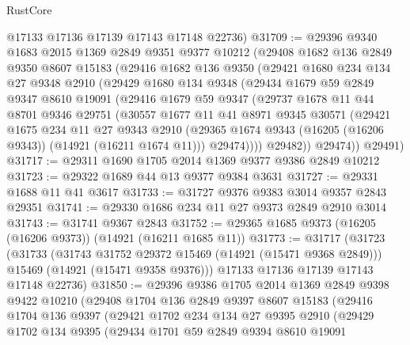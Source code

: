 \begin{lexlean}{RustCore}
\begin{coremodule}
      @17133
      @17136
      @17139
      @17143
      @17148
      @22736)
@31709 := @29396
    @9340
    @1683
    @2015
    @1369
    @2849
    @9351
    @9377
    @10212
    (@29408
      @1682
      @136
      @2849
      @9350
      @8607
      @15183
      (@29416
        @1682
        @136
        @9350
        (@29421
          @1680
          @234
          @134
          @27
          @9348
          @2910
          (@29429
            @1680
            @134
            @9348
            (@29434
              @1679
              @59
              @2849
              @9347
              @8610
              @19091
              (@29416
                @1679
                @59
                @9347
                (@29737
                  @1678
                  @11
                  @44
                  @8701
                  @9346
                  @29751
                  (@30557
                    @1677
                    @11
                    @41
                    @8971
                    @9345
                    @30571
                    (@29421
                      @1675
                      @234
                      @11
                      @27
                      @9343
                      @2910
                      (@29365 @1674 @9343 (@16205 (@16206 @9343)) (@14921 (@16211 @1674 @11)))
                      @29474))))
              @29482))
          @29474))
      @29491)
@31717 := @29311 @1690 @1705 @2014 @1369 @9377 @9386 @2849 @10212
@31723 := @29322 @1689 @44 @13 @9377 @9384 @3631
@31727 := @29331 @1688 @11 @41 @3617
@31733 := @31727 @9376 @9383 @3014 @9357 @2843 @29351
@31741 := @29330 @1686 @234 @11 @27 @9373 @2849 @2910 @3014
@31743 := @31741 @9367 @2843
@31752 := @29365 @1685 @9373 (@16205 (@16206 @9373)) (@14921 (@16211 @1685 @11))
@31773 := @31717
    (@31723
      (@31733
        (@31743 @31752 @29372 @15469 (@14921 (@15471 @9368 @2849)))
        @15469
        (@14921 (@15471 @9358 @9376)))
      @17133
      @17136
      @17139
      @17143
      @17148
      @22736)
@31850 := @29396
    @9386
    @1705
    @2014
    @1369
    @2849
    @9398
    @9422
    @10210
    (@29408
      @1704
      @136
      @2849
      @9397
      @8607
      @15183
      (@29416
        @1704
        @136
        @9397
        (@29421
          @1702
          @234
          @134
          @27
          @9395
          @2910
          (@29429
            @1702
            @134
            @9395
            (@29434
              @1701
              @59
              @2849
              @9394
              @8610
              @19091

\end{coremodule}
\end{lexlean}
